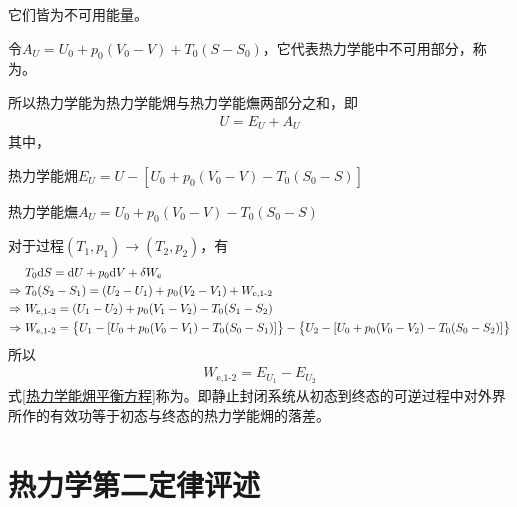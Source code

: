 \noindent 它们皆为不可用能量。
\newpage

令$A_U = U_0 + p_0 (V_0 - V) + T_0(S - S_0)$，它代表热力学能中不可用部分，称为。

所以热力学能为热力学能㶲与热力学能㷻两部分之和，即
\begin{align}
	U = E_U + A_U
\end{align}
其中，
\begin{myitemize}
	\item 热力学能㶲$E_U = U - \left[U_0 + p_0 (V_0 - V) - T_0(S_0 - S)\right]$\vspace*{-0.7em}
	\item 热力学能㷻$A_U = U_0 + p_0 (V_0 - V) - T_0(S_0 - S)$\vspace*{0.3em}
\end{myitemize}

\noindent 对于过程$(T_1, p_1) \to (T_2, p_2)$，有
\begin{align*}
	& T_0 {\rm{d}} S  = {\rm{d}} U + p_0 {\rm{d}} V + \delta W_{\text{e}}\\
	\Rightarrow \,\,& T_0(S_2 - S_1) = (U_2 - U_1) + p_0 (V_2 - V_1) + W_{\text{e,1-2}} \\
	\Rightarrow \,\,& W_{\text{e,1-2}} = (U_1 - U_2) + p_0 (V_1 - V_2) - T_0(S_1 - S_2) \\
	\Rightarrow \,\,& W_{\text{e,1-2}} = \big\lbrace U_1 - [U_ 0 + p_0(V_0 - V_1) - T_0(S_0 - S_1)] \big \rbrace - \big\lbrace U_2 - [U_ 0 + p_0(V_0 - V_2) - T_0(S_0 - S_2)]  \big \rbrace\\
\end{align*}
所以
\begin{align}
	W_{\text{e,1-2}} = E_{U_1} - E_{U_2}
	\label{热力学能㶲平衡方程}
\end{align}
式\eqref{热力学能㶲平衡方程}称为。即静止封闭系统从初态到终态的可逆过程中对外界所作的有效功等于初态与终态的热力学能㶲的落差。

\section{热力学第二定律评述}












